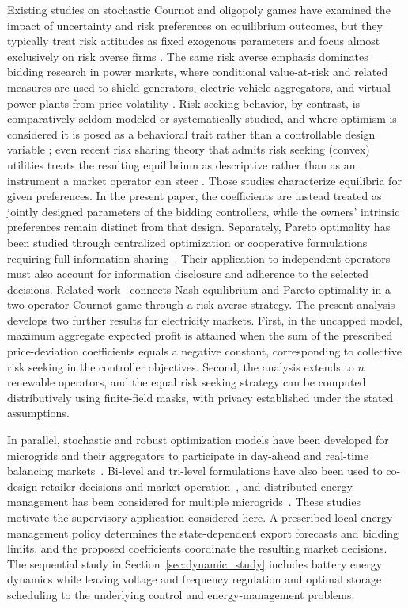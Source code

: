 \documentclass[journal]{IEEEtran}
\begin{document}
Existing studies on stochastic Cournot and oligopoly games have examined the impact of uncertainty and risk preferences on equilibrium outcomes,
but they typically treat risk attitudes as fixed exogenous parameters and focus almost exclusively on risk averse firms \cite{cheng2002bertrand,sakai1989risk, gulpinar2014analysis, asplund2002risk, Chronopoulos2014}.
The same risk averse emphasis dominates bidding research in power markets, where conditional value-at-risk and related measures are used to shield generators, electric-vehicle aggregators, and virtual power plants from price volatility \cite{Barroso2009, Gong2009, Zheng2023, Xiao2025}.
Risk-seeking behavior, by contrast, is comparatively seldom modeled or systematically studied, and where optimism is considered it is posed as a behavioral trait rather than a controllable design variable \cite{Caraballo2015, Feng2023, ZhangEcon2020}; even recent risk sharing theory that admits risk seeking (convex) utilities treats the resulting equilibrium as descriptive rather than as an instrument a market operator can steer \cite{Lauzier2024}.
Those studies characterize equilibria for given preferences. In the present paper, the coefficients are instead treated as jointly designed parameters of the bidding controllers, while the owners' intrinsic preferences remain distinct from that design. Separately, Pareto optimality has been studied through centralized optimization or cooperative formulations requiring full information sharing~\cite{hobbs2001individual,zhao2010social,su2018integrated}. Their application to independent operators must also account for information disclosure and adherence to the selected decisions. Related work~\cite{Truong26} connects Nash equilibrium and Pareto optimality in a two-operator Cournot game through a risk averse strategy. The present analysis develops two further results for electricity markets. First, in the uncapped model, maximum aggregate expected profit is attained when the sum of the prescribed price-deviation coefficients equals a negative constant, corresponding to collective risk seeking in the controller objectives. Second, the analysis extends to $n$ renewable operators, and the equal risk seeking strategy can be computed distributively using finite-field masks, with privacy established under the stated assumptions.

In parallel, stochastic and robust optimization models have been developed for microgrids and their aggregators to participate in day-ahead and real-time balancing markets~\cite{7273948,7393823,8554122}. Bi-level and tri-level formulations have also been used to co-design retailer decisions and market operation~\cite{9018247,10908096}, and distributed energy management has been considered for multiple microgrids~\cite{8141420}. These studies motivate the supervisory application considered here. A prescribed local energy-management policy determines the state-dependent export forecasts and bidding limits, and the proposed coefficients coordinate the resulting market decisions. The sequential study in Section~\ref{sec:dynamic_study} includes battery energy dynamics while leaving voltage and frequency regulation and optimal storage scheduling to the underlying control and energy-management problems.
\end{document}
